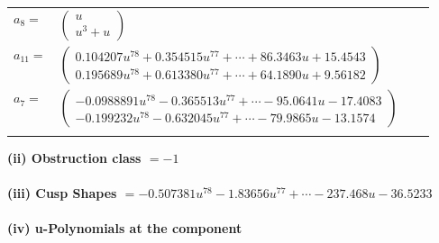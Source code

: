 \documentclass[1p]{elsarticle_modified}
\theoremstyle{definition}
\begin{document}
\begin{tabular}{m{7pt} m{180pt} m{7pt} m{180pt} }
\flushright $a_{8}=$&$\begin{pmatrix}u\\u^3+u\end{pmatrix}$ \\
\flushright $a_{11}=$&$\begin{pmatrix}0.104207 u^{78}+0.354515 u^{77}+\cdots+86.3463 u+15.4543\\0.195689 u^{78}+0.613380 u^{77}+\cdots+64.1890 u+9.56182\end{pmatrix}$ \\
\flushright $a_{7}=$&$\begin{pmatrix}-0.0988891 u^{78}-0.365513 u^{77}+\cdots-95.0641 u-17.4083\\-0.199232 u^{78}-0.632045 u^{77}+\cdots-79.9865 u-13.1574\end{pmatrix}$\\&\end{tabular}
\flushleft \textbf{(ii) Obstruction class $= -1$}\\~\\
\flushleft \textbf{(iii) Cusp Shapes $= -0.507381 u^{78}-1.83656 u^{77}+\cdots-237.468 u-36.5233$}\\~\\
\newpage\renewcommand{\arraystretch}{1}
\flushleft \textbf{(iv) u-Polynomials at the component}\newline \\
\end{document}
